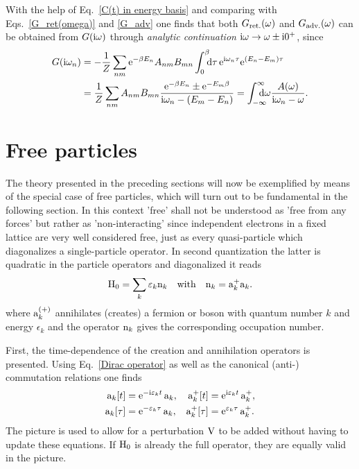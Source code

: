 With the help of Eq.~\ref{C(t) in energy basis} and comparing with
Eqs.~\ref{G_ret(omega)} and \ref{G_adv} one finds that both $G \sb{\text{ret.}}
(\omega)$ and $G \sb{\text{adv.}} (\omega)$ can be obtained from $G(\mathrm i \omega)$
through \emph{analytic continuation} $\mathrm i \omega \rightarrow \omega \pm \mathrm i 0^+$,
since
%
\begin{align*}
    G(\I \omega_n) &= -\frac 1 Z \sum_{n m}
    \E^{-\beta E_n} A_{n m} B_{m n}
    \int \from 0 \till \beta \D \tau \,
    \E^{\I \omega_n \tau} \E^{(E_n - E_m) \tau} \\
    &=
    \frac 1 Z \sum_{n m} A_{n m} B_{m n}
    \frac{\E^{-\beta E_n} \pm \E^{-E_m \beta}}{\I \omega_n - (E_m - E_n)}
    = \int \from{-\infty} \till \infty \D \omega
    \frac{A(\omega)}{\I \omega_n - \omega}.
\end{align*}

\section{Free particles}
\label{free particles}

The theory presented in the preceding sections will now be exemplified by means
of the special case of free particles, which will turn out to be fundamental in
the following section. In this context \q'free' shall not be understood as
\q'free from any forces' but rather as \q'non-interacting' since independent
 electrons in a fixed lattice are very well considered free, just as
every quasi-particle which diagonalizes a single-particle 
operator. In second quantization the latter is quadratic in the particle
operators and diagonalized it reads
%
\begin{equation} \label{H_0}
    \mathrm H_0 = \sum_k \varepsilon_k \mathrm n_k
    \quad \text{with} \quad
    \mathrm n_k = \mathrm a_k^+ \mathrm a_k.
\end{equation}
%
where $\mathrm a_k^{(+)}$ annihilates (creates) a fermion or boson with quantum
number $k$ and energy $\epsilon_k$ and the operator $\mathrm n_k$ gives the
corresponding occupation number.

First, the time-dependence of the creation and annihilation operators is
presented. Using Eq.~\ref{Dirac operator} as well as the canonical (anti-)
commutation relations one finds
%
\begin{equation} \label{time-dependent ladder operators}
    \begin{aligned}
        \mathrm a_k[t] &= \mathrm e^{-\mathrm i \varepsilon_k t} \, \mathrm a_k, &
        \mathrm a_k^+[t] &= \mathrm e^{\mathrm i \varepsilon_k t} \, \mathrm a_k^+, \\
        \mathrm a_k[\tau] &= \mathrm e^{-\varepsilon_k \tau} \, \mathrm a_k, &
        \mathrm a_k^+[\tau] &= \mathrm e^{\varepsilon_k \tau} \, \mathrm a_k^+.
    \end{aligned}
\end{equation}
%
The  picture is used to allow for a perturbation $\mathrm V$ to be added
without having to update these equations. If $\mathrm H_0$ is already the full
 operator, they are equally valid in the 
picture.

